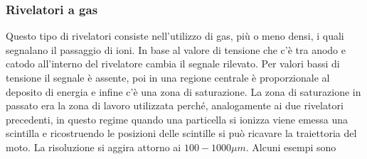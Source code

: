 \documentclass[12pt]{book}
\begin{document}
\subsubsection{Rivelatori a gas}
Questo tipo di rivelatori consiste nell'utilizzo di gas, più o meno densi, i quali segnalano il passaggio di ioni. In base al valore di tensione che c'è tra anodo e catodo all'interno del rivelatore cambia il segnale rilevato. Per valori bassi di tensione il segnale è assente, poi in una regione centrale è proporzionale al deposito di energia e infine c'è una zona di saturazione. La zona di saturazione in passato era la zona di lavoro utilizzata perché, analogamente ai due rivelatori precedenti, in questo regime quando una particella si ionizza viene emessa una scintilla e ricostruendo le posizioni delle scintille si può ricavare la traiettoria del moto. La risoluzione si aggira attorno ai $100-1000 \mu m$. Alcuni esempi sono
\end{document}
